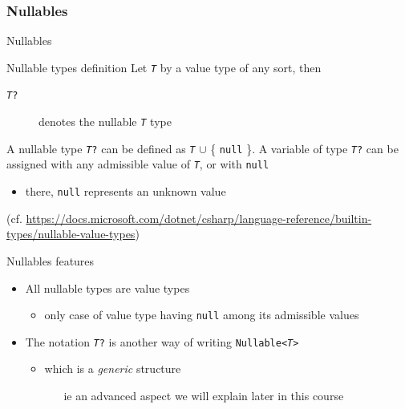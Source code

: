 \documentclass[presentation]{beamer}
\begin{document}
\subsubsection{Nullables}

\begin{frame}[allowframebreaks]{\dotnet Nullables}
    \begin{block}{Nullable types definition}
        Let \texttt{\textit{T}} by a \alert{value} type of any sort, then 
        \begin{description}
            \item[\texttt{\textit{T}\alert{?}}] denotes the \alert{nullable \texttt{\textit{T}}} type
        \end{description}

        A nullable type \texttt{\textit{T}?} can be defined as \texttt{\textit{T}} $\cup$ \{ \texttt{null} \}.
        A variable of type \texttt{\textit{T}?} can be assigned with any admissible value of \texttt{\textit{T}}, \alert{or} with \texttt{null}
        \begin{itemize}
            \item there, \texttt{null} represents an unknown value
        \end{itemize}

        {\tiny (cf. \url{https://docs.microsoft.com/dotnet/csharp/language-reference/builtin-types/nullable-value-types})}
    \end{block}

    \begin{exampleblock}{Nullables features}
        \begin{itemize}
            \item All nullable types are \alert{value} types
            \begin{itemize}
                \item only case of value type having \texttt{null} among its admissible values
            \end{itemize}

            \item The notation \texttt{\textit{T}?} is another way of writing \texttt{Nullable<\textit{T}>}
            \begin{itemize}
                \item which is a \emph{generic} structure
                \begin{itemize}
                    \item[ie] an advanced aspect we will explain later in this course
                \end{itemize}
            \end{itemize}


\end{itemize}
\end{exampleblock}
\end{frame}
\end{document}
